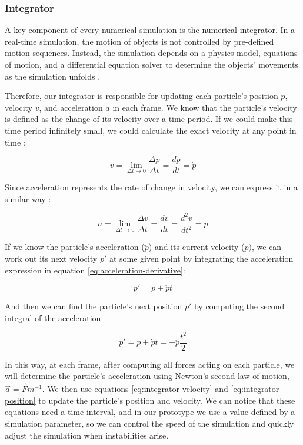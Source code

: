 \documentclass[manuscript, screen]{timtm}
\begin{document}
\subsubsection{Integrator}

A key component of every numerical simulation is the numerical integrator. In a real-time simulation, the motion of objects is not controlled by pre-defined motion sequences. Instead, the simulation depends on a physics model, equations of motion, and a differential equation solver to determine the objects' movements as the simulation unfolds \cite{physics-game-developers-oreilly}.

Therefore, our integrator is responsible for updating each particle's position $p$, velocity $v$, and acceleration $a$ in each frame. We know that the particle's velocity is defined as the change of its velocity over a time period. If we could make this time period infinitely small, we could calculate the exact velocity at any point in time \cite{game-physics-millington}:

\[
    v = \lim_{\Delta t\to 0} \frac{\Delta p}{\Delta t} = \frac{dp}{dt} = \dot{p}
\]

Since acceleration represents the rate of change in velocity, we can express it in a similar way \cite{game-physics-millington}:

\begin{equation}
\label{eq:acceleration-derivative}
     a = \lim_{\Delta t\to 0} \frac{\Delta v}{\Delta t} = \frac{dv}{dt} = \frac{d^2v}{dt^2} = \ddot{p}   
\end{equation}

If we know the particle's acceleration ($\ddot{p}$) and its current velocity ($\dot{p})$, we can work out its next velocity $\dot{p}'$ at some given point by integrating the acceleration expression in equation \ref{eq:acceleration-derivative}:

\begin{equation}
\label{eq:integrator-velocity}
    \dot{p}' = \dot{p} + \ddot{p}t
\end{equation}

And then we can find the particle's next position $p'$ by computing the second integral of the acceleration:

\begin{equation}
\label{eq:integrator-position}
    p'= p + \dot{p}t = + \ddot{p} \frac{t^2}{2}
\end{equation}

In this way, at each frame, after computing all forces acting on each particle, we will determine the particle's acceleration using Newton's second law of motion, $\vec{a} = \vec{F}m^{-1}$. We then use equations \ref{eq:integrator-velocity} and \ref{eq:integrator-position} to update the particle's position and velocity. We can notice that these equations need a time interval, and in our prototype we use a value defined by a simulation parameter, so we can control the speed of the simulation and quickly adjust the simulation when instabilities arise.
\end{document}
